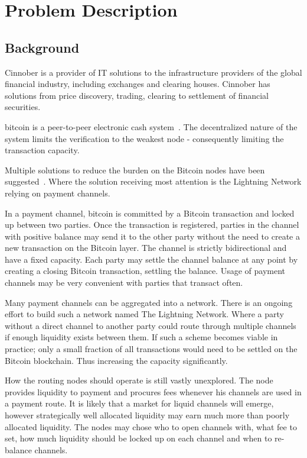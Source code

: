 \chapter{Problem Description}

\section{Background}
    \label{sec:background}

Cinnober is a provider of IT solutions to the infrastructure providers of the global financial industry, including exchanges and clearing houses. Cinnober has solutions from price discovery, trading, clearing to settlement of financial securities.

\gls{bitcoin} is a peer-to-peer electronic cash system~\cite{nakamoto:bitcoin}. The decentralized nature of the system limits the verification to the weakest node - consequently limiting the transaction capacity. 

Multiple solutions to reduce the burden on the Bitcoin nodes have been suggested~\cite{decker:wattenhofer:duplex, decker:russell:Osuntokun:eltoo, poon:dryja:lightning:network, blockstream:sidechain}. Where the solution receiving most attention is the \gls{Lightning Network} relying on payment channels.

In a payment channel, bitcoin is committed by a Bitcoin transaction and locked up between two parties. Once the transaction is registered, parties in the channel with positive balance may send it to the other party without the need to create a new transaction on the Bitcoin layer. The channel is strictly bidirectional and have a fixed capacity. Each party may settle the channel balance at any point by creating a closing Bitcoin transaction, settling the balance. Usage of payment channels may be very convenient with parties that transact often. 

Many payment channels can be aggregated into a network. There is an ongoing effort to build such a network named The Lightning Network. Where a party without a direct channel to another party could route through multiple channels if enough liquidity exists between them. If such a scheme becomes viable in practice;  only a small fraction of all transactions would need to be settled on the Bitcoin blockchain. Thus increasing the capacity significantly.

How the routing nodes should operate is still vastly unexplored. The node provides liquidity to payment and procures fees whenever his channels are used in a payment route. It is likely that a market for liquid channels will emerge, however strategically well allocated liquidity may earn much more than poorly allocated liquidity. The nodes may chose who to open channels with, what fee to set, how much liquidity should be locked up on each channel and when to re-balance channels.


